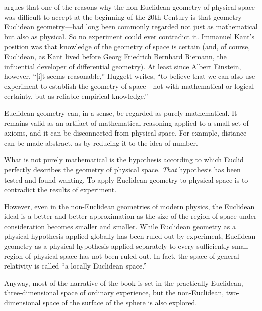 \cite{rowe-2006} argues that one of the reasons why the non-Euclidean geometry
of physical space was difficult to accept at the beginning of the 20th Century
is that geometry---Euclidean geometry---had long been commonly regarded not
just as mathematical but also as physical.  So no experiment could ever
contradict it.  Immanuel Kant's position \citep{huggett-2010} was that
knowledge of the geometry of space is certain (and, of course, Euclidean, as
Kant lived before Georg Friedrich Bernhard Riemann, the influential developer
of differential geometry).  At least since Albert Einstein, however, ``[i]t
seems reasonable,'' Huggett writes, ``to believe that we can also use
experiment to establish the geometry of space---not with mathematical or
logical certainty, but as reliable empirical knowledge.''

Euclidean geometry can, in a sense, be regarded as purely mathematical.  It
remains valid as an artifact of mathematical reasoning applied to a small set
of axioms, and it can be disconnected from physical space.  For example,
distance can be made abstract, as by reducing it to the idea of number.

What is not purely mathematical is the hypothesis according to which Euclid
perfectly describes the geometry of physical space.  \emph{That} hypothesis has
been tested and found wanting.  To apply Euclidean geometry to physical space
is to contradict the results of experiment.

However, even in the non-Euclidean geometries of modern physics, the Euclidean
ideal is a better and better approximation as the size of the region of space
under consideration becomes smaller and smaller.  While Euclidean geometry as a
physical hypothesis applied globally has been ruled out by experiment,
Euclidean geometry as a physical hypothesis applied separately to every
sufficiently small region of physical space has not been ruled out.  In fact,
the space of general relativity is called ``a locally Euclidean space.''

Anyway, most of the narrative of the book is set in the practically Euclidean,
three-dimensional space of ordinary experience, but the non-Euclidean,
two-dimensional space of the surface of the sphere is also explored.

